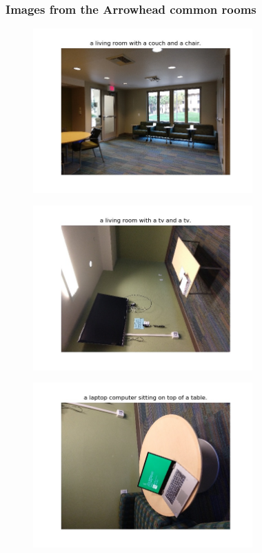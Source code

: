 \subsubsection{Images from the Arrowhead common rooms}
\begin{figure}[ht!]
\includegraphics[width=0.75\textwidth]{assets/eg/r5_out.jpg}
\end{figure}
\begin{figure}[ht!]
\includegraphics[width=0.75\textwidth]{assets/eg/r6_out.jpg}
\end{figure}
\begin{figure}[ht!]
\includegraphics[width=0.75\textwidth]{assets/eg/r7_out.jpg}
\end{figure}

